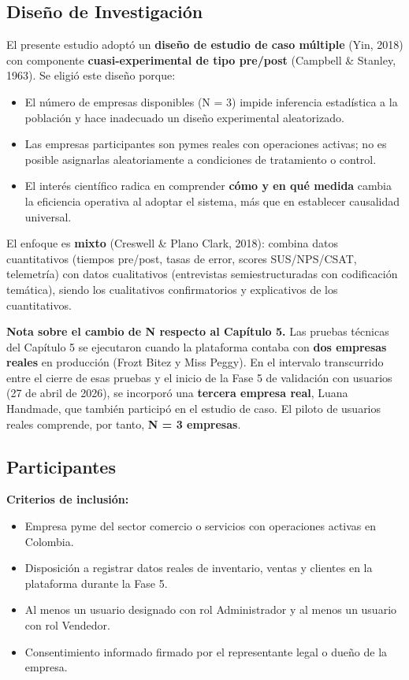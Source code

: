 \subsection{Diseño de Investigación}\label{diseuxf1o-de-investigaciuxf3n}

El presente estudio adoptó un \textbf{diseño de estudio de caso múltiple} (Yin, 2018) con componente \textbf{cuasi-experimental de tipo pre/post} (Campbell \& Stanley, 1963). Se eligió este diseño porque:

\begin{itemize}
\tightlist
\item
  El número de empresas disponibles (N = 3) impide inferencia estadística a la población y hace inadecuado un diseño experimental aleatorizado.
\item
  Las empresas participantes son pymes reales con operaciones activas; no es posible asignarlas aleatoriamente a condiciones de tratamiento o control.
\item
  El interés científico radica en comprender \textbf{cómo y en qué medida} cambia la eficiencia operativa al adoptar el sistema, más que en establecer causalidad universal.
\end{itemize}

El enfoque es \textbf{mixto} (Creswell \& Plano Clark, 2018): combina datos cuantitativos (tiempos pre/post, tasas de error, scores SUS/NPS/CSAT, telemetría) con datos cualitativos (entrevistas semiestructuradas con codificación temática), siendo los cualitativos confirmatorios y explicativos de los cuantitativos.

\textbf{Nota sobre el cambio de N respecto al Capítulo 5.} Las pruebas técnicas del Capítulo 5 se ejecutaron cuando la plataforma contaba con \textbf{dos empresas reales} en producción (Frozt Bitez y Miss Peggy). En el intervalo transcurrido entre el cierre de esas pruebas y el inicio de la Fase 5 de validación con usuarios (27 de abril de 2026), se incorporó una \textbf{tercera empresa real}, Luana Handmade, que también participó en el estudio de caso. El piloto de usuarios reales comprende, por tanto, \textbf{N = 3 empresas}.

\subsection{Participantes}\label{participantes}

\textbf{Criterios de inclusión:}

\begin{itemize}
\tightlist
\item
  Empresa pyme del sector comercio o servicios con operaciones activas en Colombia.
\item
  Disposición a registrar datos reales de inventario, ventas y clientes en la plataforma durante la Fase 5.
\item
  Al menos un usuario designado con rol Administrador y al menos un usuario con rol Vendedor.
\item
  Consentimiento informado firmado por el representante legal o dueño de la empresa.
\end{itemize}

